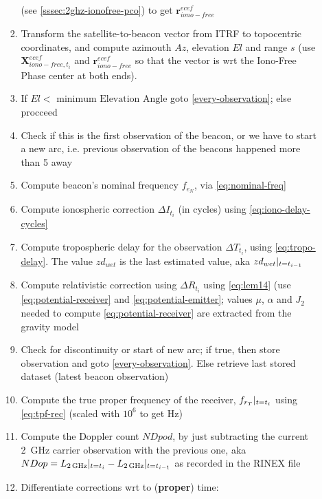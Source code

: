 \begin{enumerate}
\begin{enumerate}
\begin{enumerate}
              (see \ref{sssec:2ghz-ionofree-pco}) to get $\bm{r}^{ecef}_{iono-free}$
            \item \label{cmp-rho} Transform the satellite-to-beacon vector from ITRF to topocentric coordinates, 
              and compute azimouth $Az$, elevation $El$ and range $s$ (use $\bm{X}^{ecef}_{iono-free,t_i}$ and 
              $\bm{r}^{ecef}_{iono-free}$ so that the vector is wrt the Iono-Free 
              Phase center at both ends).
            \item If $El < \text{ minimum Elevation Angle}$ goto \ref{every-observation}; else procceed
            \item Check if this is the first observation of the beacon, or we have to start 
              a new arc, i.e. previous observation of the beacons happened more than 
              \SI{5}{\min} away
            \item Compute beacon's nominal frequency $f_{e_N}$, via \ref{eq:nominal-freq} 
            \item Compute ionospheric correction $\Delta I_{t_i}$ (in cycles) using \ref{eq:iono-delay-cycles}
            \item Compute tropospheric delay for the observation $\Delta T_{t_i}$, 
              using \ref{eq:tropo-delay}. The value $zd_{wet}$ is the last estimated 
              value, aka $zd_{wet}|_{t=t_{i-1}}$
            \item Compute relativistic correction using $\Delta R_{t_i}$ using \ref{eq:lem14}
              (use \ref{eq:potential-receiver} and \ref{eq:potential-emitter}; values 
              $\mu$, $\alpha$ and $J_2$ needed to compute \ref{eq:potential-receiver} 
              are extracted from the gravity model
            \item Check for discontinuity or start of new arc; if true, then store 
              observation and goto \ref{every-observation}. Else retrieve last 
              stored dataset (latest beacon observation)
            \item Compute the true proper frequency of the receiver, $f_{r_T}|_{t=t_i}$ 
              using \ref{eq:tpf-rec} (scaled with $10^6$ to get \si{\Hz})
            \item Compute the Doppler count $NDpod$, by just subtracting the current 
              \SI{2}{\GHz} carrier observation with the previous one, aka
              $NDop = L_{\SI{2}{\GHz}}\at{t=t_i} - L_{\SI{2}{\GHz}}\at{t=t_{i-1}}$
              as recorded in the RINEX file
            \item Differentiate corrections wrt to (\textbf{proper}) time:

\end{enumerate}
\end{enumerate}
\end{enumerate}
